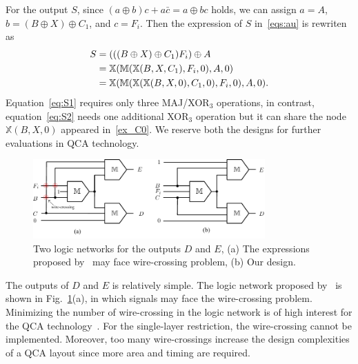 \documentclass[9pt,journal,compsoc]{IEEEtran}
\begin{document}
For the output $S$, since $(a \oplus b)c + a\bar c = a \oplus bc$ holds, we can assign $a = A$, $b = (B \oplus X) \oplus C_1$, and $c = F_i$. Then
the expression of $S$ in~\eqref{eqs:au} is rewriten as
\begin{subequations}\label{ex_S}
\begin{align}
S &= (((B \oplus X) \oplus C_1)F_i) \oplus A \notag \\
  &= \mathbb{X}(\mathbb{M}(\mathbb{X}(B, X, C_1), F_i, 0), A, 0) \label{eq:S1}\\
  &= \mathbb{X}(\mathbb{M}(\mathbb{X}(\mathbb{X}(B, X, 0), C_{1}, 0), F_{i}, 0), A, 0). \label{eq:S2}
\end{align}
\end{subequations}
Equation~\eqref{eq:S1} requires only three MAJ/XOR$_3$ operations, in contrast, equation~\eqref{eq:S2} needs one additional XOR$_3$ operation but it can share the node $\mathbb{X}(B, X, 0)$ appeared in~\eqref{ex_C0}.
We reserve both the designs for further evaluations in QCA technology.

\begin{figure}
\centering
\includegraphics[width=3.5in]{fig/wire_cross.pdf}
\caption{Two logic networks for the outputs $D$ and $E$, (a) The expressions proposed by~\cite{2} may face wire-crossing problem, (b) Our design.}
\label{fig:wire_cross}
\end{figure}


The outputs of $D$ and $E$ is relatively simple. The logic network proposed by~\cite{2} is shown in Fig.~\ref{fig:wire_cross}(a), in which signals may face the wire-crossing problem. Minimizing the number of wire-crossing in the logic network is of high interest for the QCA technology~\cite{nath2017optimal}.
For the single-layer restriction, the wire-crossing cannot be implemented.
Moreover, too many wire-crossings increase the design complexities of a QCA layout since more area and timing are required.
\end{document}

